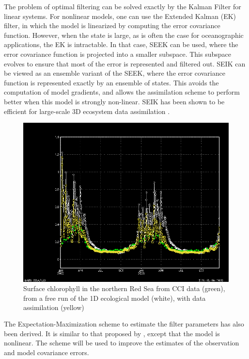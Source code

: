 The problem of optimal filtering can be solved exactly by the Kalman Filter for
linear systems. For nonlinear models, one can use the Extended Kalman (EK)
filter, in which the model is linearized by computing the error covariance
function.  However, when the state is large, as is often the case for
oceanographic applications, the EK is intractable. In that case, SEEK can be
used, where the error covariance function is projected into a smaller subspace.
This subspace evolves to ensure that most of the error is represented and
filtered out. SEIK can be viewed as an ensemble variant of the SEEK, where the
error covariance function is represented exactly by an ensemble of states. This
avoids the computation of model gradients, and allows the assimilation scheme
to perform better when this model is strongly non-linear. SEIK has been shown
to be efficient for large-scale 3D ecosystem data assimilation
\citep{Triantafyllou2003}.

\begin{figure}
    \centering
    \includegraphics[scale=.45]{figures/chl_factor.png}
    \caption{Surface chlorophyll in the northern Red Sea from CCI data (green),
             from a free run of the 1D ecological model (white), with data
             assimilation (yellow)}
    \label{assim}
\end{figure}


The Expectation-Maximization scheme to estimate the filter parameters has also
been derived. It is similar to that proposed by \citet{Tandeo2014}, 
except that the model is nonlinear. The scheme will be used to improve
the estimates of the observation and model covariance errors.
